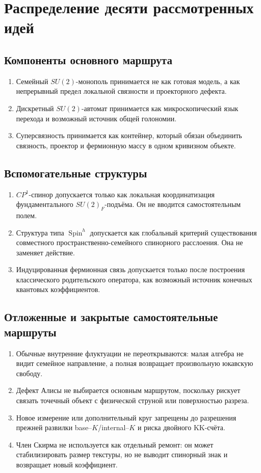 \section{Распределение десяти рассмотренных идей}

\subsection{Компоненты основного маршрута}

\begin{enumerate}
 \item Семейный $SU(2)$-монополь принимается не как готовая модель, а как
 непрерывный предел локальной связности и проекторного дефекта.
 \item Дискретный $SU(2)$-автомат принимается как микроскопический язык
 перехода и возможный источник общей голономии.
 \item Суперсвязность принимается как контейнер, который обязан объединить
 связность, проектор и фермионную массу в одном кривизном объекте.
\end{enumerate}

\subsection{Вспомогательные структуры}

\begin{enumerate}
 \item $CP^1$-спинор допускается только как локальная координатизация
 фундаментального $SU(2)_F$-подъёма. Он не вводится самостоятельным полем.
 \item Структура типа $\operatorname{Spin}^h$ допускается как глобальный
 критерий существования совместного пространственно-семейного спинорного
 расслоения. Она не заменяет действие.
 \item Индуцированная фермионная связь допускается только после построения
 классического родительского оператора, как возможный источник конечных
 квантовых коэффициентов.
\end{enumerate}

\subsection{Отложенные и закрытые самостоятельные маршруты}

\begin{enumerate}
 \item Обычные внутренние флуктуации не переоткрываются: малая алгебра не
 видит семейное направление, а полная возвращает произвольную юкавскую
 свободу.
 \item Дефект Алисы не выбирается основным маршрутом, поскольку рискует
 связать точечный объект с физической струной или поверхностью разреза.
 \item Новое измерение или дополнительный круг запрещены до разрешения
 прежней развилки base--$K$/internal--$K$ и риска двойного KK-счёта.
 \item Член Скирма не используется как отдельный ремонт: он может
 стабилизировать размер текстуры, но не выводит спинорный знак и возвращает
 новый коэффициент.
\end{enumerate}

